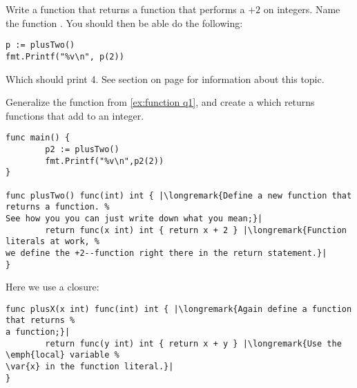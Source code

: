 \begin{Exercise}[title={Functions that return functions},difficulty=1]
\label{ex:function}
\Question\label{ex:function q1} Write a function that returns a function
that performs a $+2$ on integers. Name the function .
You should then be able do the following:
\begin{lstlisting}
p := plusTwo()
fmt.Printf("%v\n", p(2))
\end{lstlisting}
Which should print 4.
See section  on page \pageref{sec:callbacks} for information
about this topic.

\Question\label{ex:function q2} Generalize the function from \ref{ex:function q1},
and create a  which returns functions that add  to an
integer.
\end{Exercise}

\begin{Answer}
\Question
\begin{lstlisting}
func main() {
        p2 := plusTwo()
        fmt.Printf("%v\n",p2(2))
}

func plusTwo() func(int) int { |\longremark{Define a new function that returns a function. %
See how you you can just write down what you mean;}|
        return func(x int) int { return x + 2 } |\longremark{Function literals at work, %
we define the +2--function right there in the return statement.}|
}
\end{lstlisting}
\showremarks

\Question
Here we use a closure:
\begin{lstlisting}
func plusX(x int) func(int) int { |\longremark{Again define a function that returns %
a function;}|
        return func(y int) int { return x + y } |\longremark{Use the \emph{local} variable %
\var{x} in the function literal.}|
}
\end{lstlisting}
\showremarks
\end{Answer}
